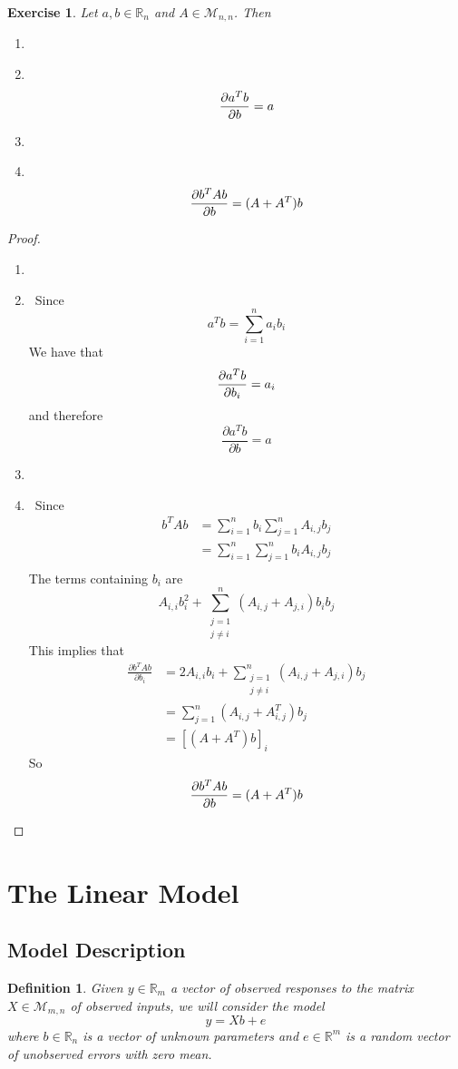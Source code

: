 \documentclass[12pt]{amsart}
\newcommand\Item[1][]{%
  \ifx\relax#1\relax  \item \else \item[#1] \fi
  \abovedisplayskip=0pt\abovedisplayshortskip=0pt~\vspace*{-\baselineskip}}
\newtheorem{defn}[thm]{Definition}
\newtheorem{ex}[thm]{Exercise}
\newcommand{\R}{\mathbb{R}}
\newcommand{\MM}{\mathcal{M}}
\begin{document}
\begin{ex}
Let $a, b  \in \R_n$ and $A \in \MM_{n, n}$. Then \vspace{2mm}
\begin{enumerate}
\Item $$\pdv{a^Tb}{b} = a$$ \vspace{2mm}
\Item $$\pdv{b^T A b}{b} = (A+A^T)b$$
\end{enumerate} 
\end{ex}

\begin{proof}\
\begin{enumerate}
\Item Since $$a^Tb = \sum_{i=1}^n a_ib_i$$ We have that $$\pdv{a^Tb}{b_i} = a_i$$ and therefore $$\frac{\partial a^Tb}{\partial b} = a$$ \vspace{3mm}
\Item Since 
\begin{align*}
b^T A b 
&= \sum_{i = 1}^n b_i \sum_{j=1}^n A_{i,j}b_j \\
&= \sum_{i = 1}^n \sum_{j=1}^n b_iA_{i,j}b_j \\
\end{align*}
The terms containing $b_i$ are $$A_{i,i}b_i^2 + \sum_{\substack{ j=1 \\ j \neq i}}^n (A_{i,j} + A_{j,i})b_ib_j$$
This implies that 
\begin{align*}
\frac{\partial b^TAb}{\partial b_i} 
&= 2A_{i,i}b_i + \sum_{\substack{j=1 \\ j\neq i}}^n (A_{i,j}+A_{j,i})b_j\\
&= \sum_{j=1}^n (A_{i,j}+A^T_{i,j})b_j\\
&= [(A+A^T)b]_i
\end{align*}
So $$\pdv{b^T A b}{b} = (A+A^T)b$$
\end{enumerate}
\end{proof} 

\section{The Linear Model}
\subsection{Model Description}
\begin{defn}
Given $y \in \R_m$ a vector of observed responses to the matrix $X \in \MM_{m,n}$ of observed inputs, we will consider the model $$y = Xb +e$$ where $b \in \R_n$ is a vector of unknown parameters and $e \in \R^m$ is a random vector of unobserved errors with zero mean. 
\end{defn}
\end{document}
